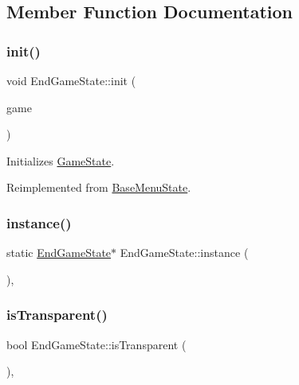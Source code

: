 \subsection{Member Function Documentation}
\mbox{\label{class_end_game_state_ac3abeb54305351ce65b66d519ca3e0c1}} 
\subsubsection{\texorpdfstring{init()}{init()}}
{\footnotesize\ttfamily void End\+Game\+State\+::init (\begin{DoxyParamCaption}\item[{\mbox{\hyperlink{class_game_engine}{Game\+Engine}} $\ast$}]{game }\end{DoxyParamCaption})\hspace{0.3cm}{\ttfamily [virtual]}}



Initializes \mbox{\hyperlink{class_game_state}{Game\+State}}. 



Reimplemented from \mbox{\hyperlink{class_base_menu_state_ae29d522c56a4582ce79e113426421741}{Base\+Menu\+State}}.

\mbox{\label{class_end_game_state_acf46076d50ef1a957b0e42a4c7668578}} 
\subsubsection{\texorpdfstring{instance()}{instance()}}
{\footnotesize\ttfamily static \mbox{\hyperlink{class_end_game_state}{End\+Game\+State}}$\ast$ End\+Game\+State\+::instance (\begin{DoxyParamCaption}{ }\end{DoxyParamCaption})\hspace{0.3cm}{\ttfamily [inline]}, {\ttfamily [static]}}

\mbox{\label{class_end_game_state_a0cafb4ddc794cdbde37e1624ef02bbf9}} 
\subsubsection{\texorpdfstring{isTransparent()}{isTransparent()}}
{\footnotesize\ttfamily bool End\+Game\+State\+::is\+Transparent (\begin{DoxyParamCaption}{ }\end{DoxyParamCaption})\hspace{0.3cm}{\ttfamily [inline]}, {\ttfamily [virtual]}}



